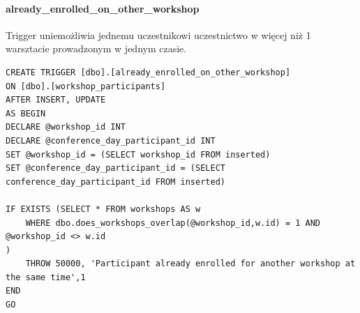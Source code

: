 \documentclass[12pt]{article}
\begin{document}
\paragraph{already\_enrolled\_on\_other\_workshop \\}
Trigger uniemożliwia jednemu uczestnikowi uczestnictwo w więcej niż 1 warsztacie prowadzonym w jednym czasie.\\
\begin{lstlisting}
CREATE TRIGGER [dbo].[already_enrolled_on_other_workshop]
ON [dbo].[workshop_participants]
AFTER INSERT, UPDATE
AS BEGIN
DECLARE @workshop_id INT
DECLARE @conference_day_participant_id INT
SET @workshop_id = (SELECT workshop_id FROM inserted)
SET @conference_day_participant_id = (SELECT conference_day_participant_id FROM inserted)

IF EXISTS (SELECT * FROM workshops AS w
	WHERE dbo.does_workshops_overlap(@workshop_id,w.id) = 1 AND @workshop_id <> w.id
)
	THROW 50000, 'Participant already enrolled for another workshop at the same time',1
END
GO

\end{lstlisting}
\newpage

\paragraph{}
\begin{lstlisting}

\end{lstlisting}
\newpage

\paragraph{}
\begin{lstlisting}

\end{lstlisting}
\newpage

\paragraph{}
\begin{lstlisting}

\end{lstlisting}
\newpage
\end{document}
